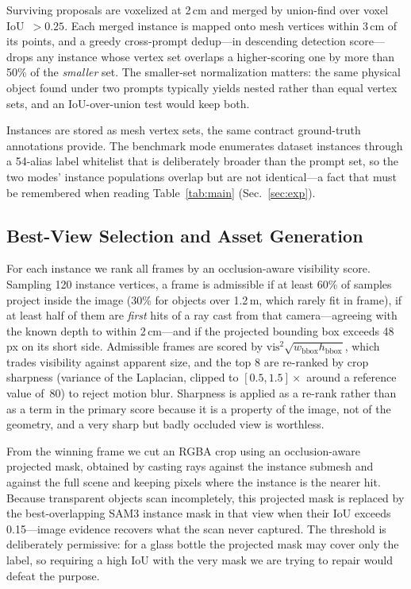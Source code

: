 Surviving proposals are voxelized at 2\,cm and merged by union-find over
voxel IoU~$>0.25$. Each merged instance is mapped onto mesh vertices
within 3\,cm of its points, and a greedy cross-prompt dedup---in
descending detection score---drops any instance whose vertex set overlaps
a higher-scoring one by more than 50\% of the \emph{smaller} set. The
smaller-set normalization matters: the same physical object found under
two prompts typically yields nested rather than equal vertex sets, and an
IoU-over-union test would keep both.

Instances are stored as mesh vertex sets, the same contract ground-truth
annotations provide. The benchmark mode enumerates dataset instances
through a 54-alias label whitelist that is deliberately broader than the
prompt set, so the two modes' instance populations overlap but are not
identical---a fact that must be remembered when reading
Table~\ref{tab:main} (Sec.~\ref{sec:exp}).

\subsection{Best-View Selection and Asset Generation}
For each instance we rank all frames by an occlusion-aware visibility
score. Sampling 120 instance vertices, a frame is admissible if at least
60\% of samples project inside the image (30\% for objects over 1.2\,m,
which rarely fit in frame), if at least half of them are \emph{first}
hits of a ray cast from that camera---agreeing with the known depth to
within 2\,cm---and if the projected bounding box exceeds 48\,px on its
short side. Admissible frames are scored by
$\mathrm{vis}^2\sqrt{w_{\text{bbox}}h_{\text{bbox}}}$, which trades
visibility against apparent size, and the top 8 are re-ranked by crop
sharpness (variance of the Laplacian, clipped to $[0.5,1.5]\times$ around
a reference value of~80) to reject motion blur. Sharpness is applied as a
re-rank rather than as a term in the primary score because it is a
property of the image, not of the geometry, and a very sharp but badly
occluded view is worthless.

From the winning frame we cut an RGBA crop using an occlusion-aware
projected mask, obtained by casting rays against the instance submesh and
against the full scene and keeping pixels where the instance is the
nearer hit. Because transparent objects scan incompletely, this projected
mask is replaced by the best-overlapping SAM3 instance mask in that view
when their IoU exceeds 0.15---image evidence recovers what the scan never
captured. The threshold is deliberately permissive: for a glass bottle the
projected mask may cover only the label, so requiring a high IoU with the
very mask we are trying to repair would defeat the purpose.


